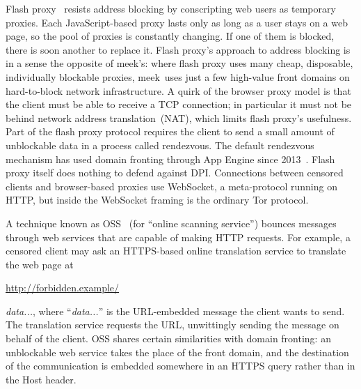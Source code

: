 \documentclass[conference]{IEEEtran}
\newcommand{\meek}{meek\xspace}
\def\urll#1{\begin{NoHyper}\url{#1}\end{NoHyper}}
\begin{document}
Flash proxy~\cite{flashproxy} resists address blocking by
conscripting web users as temporary proxies.
Each JavaScript-based proxy lasts only as long as a
user stays on a web page, so the pool of proxies is constantly changing.
If one of them is blocked, there is soon another to replace it.
Flash proxy's approach to address blocking is in a sense
the opposite of \meek's:
where flash proxy uses many cheap, disposable, individually blockable proxies,
\meek\ uses just a few high-value front domains on hard-to-block network infrastructure.
A quirk of the browser proxy model is that
the client must be able to receive a TCP connection; in particular it
must not be behind network address translation~(NAT), which limits flash proxy's usefulness.
Part of the flash proxy protocol requires the client to send
a small amount of unblockable data in a process called rendezvous.
The default rendezvous mechanism has used domain fronting through App Engine since 2013~\cite{flashproxy-reg-appspot}.
Flash proxy itself does nothing to defend against DPI.
Connections between censored clients and browser-based proxies use
WebSocket, a meta-protocol running on HTTP,
but inside the WebSocket framing is the ordinary Tor protocol.

A technique known as OSS~\cite{oss} (for
``online scanning service'') bounces messages
through web services that are capable of making HTTP requests.
For example, a censored client may ask an HTTPS-based online translation service to
translate the web page at \urll{http://forbidden.example/}\textsl{data...},
where ``\textsl{data...}'' is the URL-embedded message the client wants to send.
The translation service requests the URL,
unwittingly sending the message on behalf of the client.
OSS shares certain similarities with domain fronting:
an unblockable web service takes the place of the front domain,
and the destination of the communication is embedded somewhere in an HTTPS query
rather than in the Host header.
\end{document}
